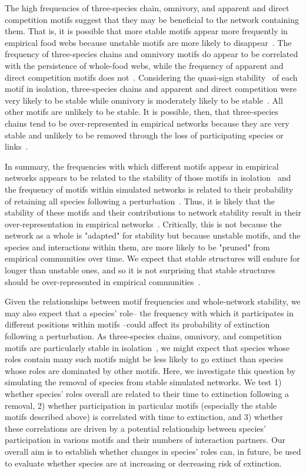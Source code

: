\documentclass[12pt]{article}
\begin{document}
	The high frequencies of three-species chain, omnivory, and apparent and direct competition motifs suggest that they may be beneficial to the network containing them. That is, it is possible that more stable motifs appear more frequently in empirical food webs because unstable motifs are more likely to disappear~\citep{Borrelli2015,Borrelli2015a}. The frequency of three-species chains and omnivory motifs do appear to be correlated with the persistence of whole-food webs, while the frequency of apparent and direct competition motifs does not~\citep{Stouffer2010}. Considering the quasi-sign stability~\citep{Allesina2008} of each motif in isolation, three-species chains and apparent and direct competition were very likely to be stable while omnivory is moderately likely to be stable~\citep{Borrelli2015a}. All other motifs are unlikely to be stable. It is possible, then, that three-species chains tend to be over-represented in empirical networks because they are very stable and unlikely to be removed through the loss of participating species or links~\citep{Borrelli2015}.  


	In summary, the frequencies with which different motifs appear in empirical networks appears to be related to the stability of those motifs in isolation~\citep{Stouffer2010b,Borrelli2015a} and the frequency of motifs within simulated networks is related to their probability of retaining all species following a perturbation~\citep{Stouffer2010b}. Thus, it is likely that the stability of these motifs and their contributions to network stability result in their over-representation in empirical networks~\citep{Borrelli2015}. Critically, this is not because the network as a whole is "adapted" for stability but because unstable motifs, and the species and interactions within them, are more likely to be "pruned" from empirical communities over time. We expect that stable structures will endure for longer than unstable ones, and so it is not surprising that stable structures should be over-represented in empirical communities~\citep{Borrelli2015}.


	Given the relationships between motif frequencies and whole-network stability, we may also expect that a species' role-- the frequency with which it participates in different positions within motifs --could affect its probability of extinction following a perturbation. As three-species chains, omnivory, and competition motifs are particularly stable in isolation~\citep{Borrelli2015a}, we might expect that species whose roles contain many such motifs might be less likely to go extinct than species whose roles are dominated by other motifs. Here, we investigate this question by simulating the removal of species from stable simulated networks. We test 1) whether species' roles overall are related to their time to extinction following a removal, 2) whether participation in particular motifs (especially the stable motifs described above) is correlated with time to extinction, and 3) whether these correlations are driven by a potential relationship between species' participation in various motifs and their numbers of interaction partners. Our overall aim is to establish whether changes in species' roles can, in future, be used to evaluate whether species are at increasing or decreasing risk of extinction.
\end{document}
